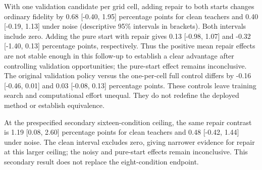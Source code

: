 With one validation candidate per grid cell, adding repair to both starts changes ordinary fidelity by 0.68 [-0.40, 1.95] percentage points for clean teachers and 0.40 [-0.19, 1.13] under noise (descriptive 95\% intervals in brackets). Both intervals include zero. Adding the pure start with repair gives 0.13 [-0.98, 1.07] and -0.32 [-1.40, 0.13] percentage points, respectively. Thus the positive mean repair effects are not stable enough in this follow-up to establish a clear advantage after controlling validation opportunities; the pure-start effect remains inconclusive. The original validation policy versus the one-per-cell full control differs by -0.16 [-0.46, 0.01] and 0.03 [-0.08, 0.13] percentage points. These controls leave training search and computational effort unequal. They do not redefine the deployed method or establish equivalence.

At the prespecified secondary sixteen-condition ceiling, the same repair contrast is 1.19 [0.08, 2.60] percentage points for clean teachers and 0.48 [-0.42, 1.44] under noise. The clean interval excludes zero, giving narrower evidence for repair at this larger ceiling; the noisy and pure-start effects remain inconclusive. This secondary result does not replace the eight-condition endpoint.
